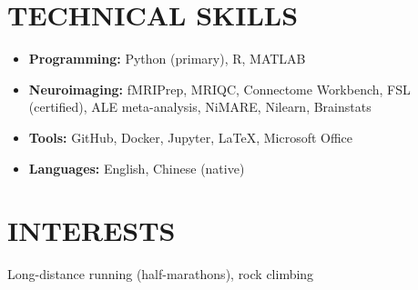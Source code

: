 \documentclass[10pt,a4paper]{article}
\begin{document}
\section*{TECHNICAL SKILLS}
\begin{itemize}
    \item \textbf{Programming:} Python (primary), R, MATLAB 
    \item \textbf{Neuroimaging:} fMRIPrep, MRIQC, Connectome Workbench, FSL (certified), ALE meta-analysis, NiMARE, Nilearn, Brainstats
    \item \textbf{Tools:} GitHub, Docker, Jupyter, LaTeX, Microsoft Office
    \item \textbf{Languages:} English, Chinese (native)
\end{itemize}

\vspace{1 em} 

\section*{INTERESTS}
Long-distance running (half-marathons), rock climbing
\end{document}
